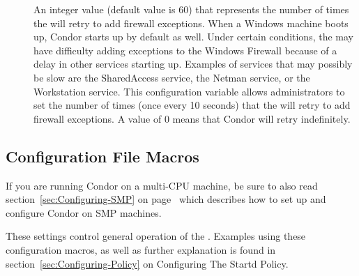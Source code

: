 \begin{description}
\item[]
  \label{param:WindowsFirewallFailureRetry} 
  An integer value (default value is 60) that represents
  the number of times the  will retry to add
  firewall exceptions.
  When a Windows machine boots
  up, Condor starts up by default as well. Under certain conditions, the
   may have difficulty adding exceptions to the Windows
  Firewall because of a delay in other services starting up.
  Examples of services that may possibly be slow are the 
  SharedAccess service, the Netman service, or the Workstation service.
  This configuration variable allows administrators to set the number of
  times (once every 10 seconds) that the  will retry
  to add firewall exceptions. A value of 0 means that Condor will
  retry indefinitely.

\end{description}

\subsection{\label{sec:Startd-Config-File-Entries}
Configuration File Macros}

\Note If you are running Condor on a multi-CPU machine, be sure
to also read section~\ref{sec:Configuring-SMP} on
page~\pageref{sec:Configuring-SMP} which describes how to set up and
configure Condor on SMP machines.

These settings control general operation of the .
Examples using these configuration macros,
as well as further explanation is found in
section~\ref{sec:Configuring-Policy} on
Configuring The Startd Policy.

